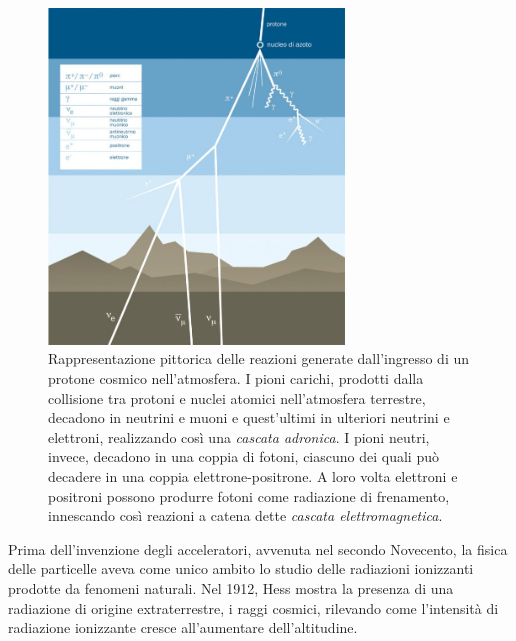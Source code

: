 \documentclass[../main.tex]{subfiles}
\begin{document}
\begin{figure}[!b]
    \centering
    \includegraphics[width=0.7\textwidth]{cosmic.jpg}
    \caption{Rappresentazione pittorica delle reazioni generate dall'ingresso di un protone cosmico nell'atmosfera. I pioni carichi, prodotti dalla collisione tra protoni e nuclei atomici nell'atmosfera terrestre, decadono in neutrini e muoni e quest'ultimi in ulteriori neutrini e elettroni, realizzando così una \emph{cascata adronica}. I pioni neutri, invece, decadono in una coppia di fotoni, ciascuno dei quali può decadere in una coppia elettrone-positrone. A loro volta elettroni e positroni possono produrre fotoni come radiazione di frenamento, innescando così reazioni a catena dette \emph{cascata elettromagnetica}.
    \cite{as10_vdu}}
    \label{fig:cosmic}
\end{figure}

Prima dell'invenzione degli acceleratori, avvenuta nel secondo Novecento, la fisica delle particelle aveva come unico ambito lo studio delle radiazioni ionizzanti prodotte da fenomeni naturali.
Nel 1912, Hess mostra la presenza di una radiazione di origine extraterrestre, i raggi cosmici, rilevando come l'intensità di radiazione ionizzante cresce all'aumentare dell'altitudine.
\end{document}
